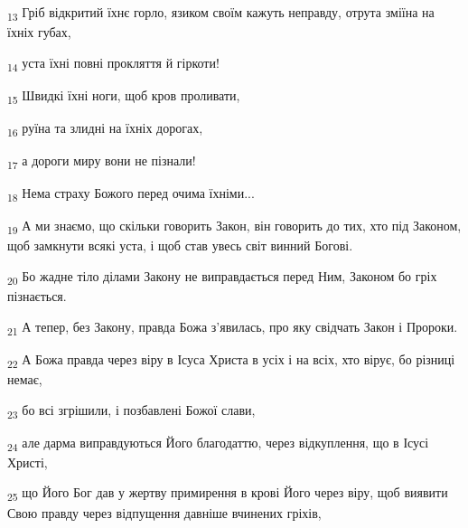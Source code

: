 \begin{tcolorbox}
\textsubscript{13} Гріб відкритий їхнє горло, язиком своїм кажуть неправду, отрута зміїна на їхніх губах,
\end{tcolorbox}
\begin{tcolorbox}
\textsubscript{14} уста їхні повні прокляття й гіркоти!
\end{tcolorbox}
\begin{tcolorbox}
\textsubscript{15} Швидкі їхні ноги, щоб кров проливати,
\end{tcolorbox}
\begin{tcolorbox}
\textsubscript{16} руїна та злидні на їхніх дорогах,
\end{tcolorbox}
\begin{tcolorbox}
\textsubscript{17} а дороги миру вони не пізнали!
\end{tcolorbox}
\begin{tcolorbox}
\textsubscript{18} Нема страху Божого перед очима їхніми...
\end{tcolorbox}
\begin{tcolorbox}
\textsubscript{19} А ми знаємо, що скільки говорить Закон, він говорить до тих, хто під Законом, щоб замкнути всякі уста, і щоб став увесь світ винний Богові.
\end{tcolorbox}
\begin{tcolorbox}
\textsubscript{20} Бо жадне тіло ділами Закону не виправдається перед Ним, Законом бо гріх пізнається.
\end{tcolorbox}
\begin{tcolorbox}
\textsubscript{21} А тепер, без Закону, правда Божа з'явилась, про яку свідчать Закон і Пророки.
\end{tcolorbox}
\begin{tcolorbox}
\textsubscript{22} А Божа правда через віру в Ісуса Христа в усіх і на всіх, хто вірує, бо різниці немає,
\end{tcolorbox}
\begin{tcolorbox}
\textsubscript{23} бо всі згрішили, і позбавлені Божої слави,
\end{tcolorbox}
\begin{tcolorbox}
\textsubscript{24} але дарма виправдуються Його благодаттю, через відкуплення, що в Ісусі Христі,
\end{tcolorbox}
\begin{tcolorbox}
\textsubscript{25} що Його Бог дав у жертву примирення в крові Його через віру, щоб виявити Свою правду через відпущення давніше вчинених гріхів,
\end{tcolorbox}
